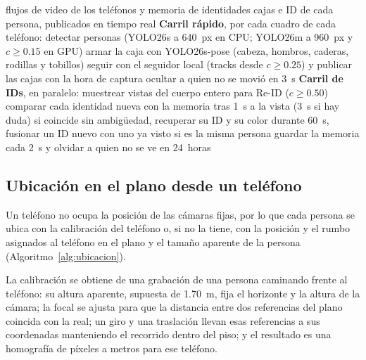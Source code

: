 \documentclass[12pt,a4paper]{article}
\begin{document}
\begin{algorithm}[H]
\caption{Modelo en vivo de dos carriles}
\label{alg:vivo}
\begin{algorithmic}[1]
\REQUIRE flujos de video de los teléfonos y memoria de identidades
\ENSURE cajas e ID de cada persona, publicados en tiempo real
\STATE \textbf{Carril rápido}, por cada cuadro de cada teléfono:
\STATE \hspace{1.2em} detectar personas (YOLO26s a 640~px en CPU; YOLO26m a 960~px y $c \geq 0.15$ en GPU)
\STATE \hspace{1.2em} armar la caja con YOLO26s-pose (cabeza, hombros, caderas, rodillas y tobillos)
\STATE \hspace{1.2em} seguir con el seguidor local (tracks desde $c \geq 0.25$) y publicar las cajas con la hora de captura
\STATE \hspace{1.2em} ocultar a quien no se movió en 3~s
\STATE \textbf{Carril de IDs}, en paralelo:
\STATE \hspace{1.2em} muestrear vistas del cuerpo entero para Re-ID ($c \geq 0.50$)
\STATE \hspace{1.2em} comparar cada identidad nueva con la memoria tras 1~s a la vista (3~s si hay duda)
\STATE \hspace{1.2em} si coincide sin ambigüedad, recuperar su ID y su color
\STATE \hspace{1.2em} durante 60~s, fusionar un ID nuevo con uno ya visto si es la misma persona
\STATE \hspace{1.2em} guardar la memoria cada 2~s y olvidar a quien no se ve en 24~horas
\end{algorithmic}
\end{algorithm}

\subsection{Ubicación en el plano desde un teléfono}

Un teléfono no ocupa la posición de las cámaras fijas, por lo que cada persona
se ubica con la calibración del teléfono o, si no la tiene, con la posición y
el rumbo asignados al teléfono en el plano y el tamaño aparente de la persona
(Algoritmo~\ref{alg:ubicacion}).

La calibración se obtiene de una grabación de una persona caminando frente al
teléfono: su altura aparente, supuesta de 1.70~m, fija el horizonte y la
altura de la cámara; la focal se ajusta para que la distancia entre dos
referencias del plano coincida con la real; un giro y una traslación llevan
esas referencias a sus coordenadas manteniendo el recorrido dentro del piso; y
el resultado es una homografía de píxeles a metros para ese teléfono.
\end{document}

